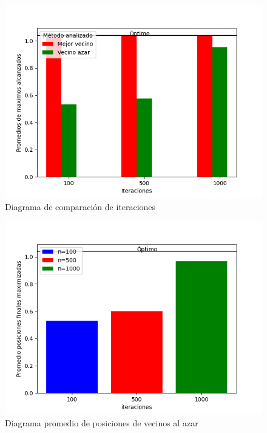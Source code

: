 \documentclass{article}
\begin{document}
\newpage
\begin{figure}
    \centering
    \includegraphics[width=200mm]{comparacion_metodos.png}
    \caption{Diagrama de comparación de iteraciones}
    \label{figure}
\end{figure}

\begin{figure}
    \centering
    \includegraphics[width=200mm]{R1_prom_vec_azar.png}
    \caption{Diagrama promedio de posiciones de vecinos al azar}
    \label{figure}
\end{figure}
\end{document}

